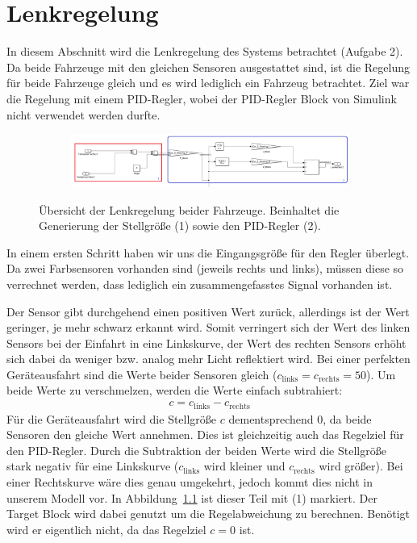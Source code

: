 \chapter{Lenkregelung}\label{sec:Lenkregelung}
In diesem Abschnitt wird die Lenkregelung des Systems betrachtet (Aufgabe 2). Da
beide Fahrzeuge mit den gleichen Sensoren ausgestattet sind, ist die Regelung
für beide Fahrzeuge gleich und es wird lediglich ein Fahrzeug betrachtet. Ziel
war die Regelung mit einem PID-Regler, wobei der PID-Regler Block von Simulink
nicht verwendet werden durfte.
\begin{figure}[hbt]
\centering
\begin{subfigure}{\textwidth}
    \centering
    \includegraphics*[width=\textwidth]{figures/Lenkregelung.png}
\end{subfigure}
    \caption{Übersicht der Lenkregelung beider Fahrzeuge. Beinhaltet die
        Generierung der Stellgröße (1) sowie den PID-Regler (2).
    \label{fig:lenkregelung}}
\end{figure}    
In einem ersten Schritt haben wir uns die Eingangsgröße für den Regler überlegt.
Da zwei Farbsensoren vorhanden sind (jeweils rechts und links), müssen diese so
verrechnet werden, dass lediglich ein zusammengefasstes Signal vorhanden ist.

Der Sensor gibt durchgehend einen positiven Wert zurück, allerdings ist der Wert
geringer, je mehr schwarz erkannt wird. Somit verringert sich der Wert des
linken Sensors bei der Einfahrt in eine Linkskurve, der Wert des rechten Sensors
erhöht sich dabei da weniger bzw. analog mehr Licht reflektiert wird. Bei einer
perfekten Geräteausfahrt sind die Werte beider Sensoren gleich
($c_\mathrm{links} = c_\mathrm{rechts} = 50$). Um beide Werte zu verschmelzen,
werden die Werte einfach subtrahiert:
\begin{align*}
    c = c_\mathrm{links} - c_\mathrm{rechts}
\end{align*}
Für die Geräteausfahrt wird die Stellgröße $c$ dementsprechend $0$, da beide
Sensoren den gleiche Wert annehmen. Dies ist gleichzeitig auch das Regelziel für
den PID-Regler. Durch die Subtraktion der beiden Werte wird die Stellgröße stark
negativ für eine Linkskurve ($c_\mathrm{links}$ wird kleiner und
$c_\mathrm{rechts}$ wird größer). Bei einer Rechtskurve wäre dies genau
umgekehrt, jedoch kommt dies nicht in unserem Modell vor. In
Abbildung~\ref{fig:lenkregelung} ist dieser Teil mit (1) markiert. Der Target
Block wird dabei genutzt um die Regelabweichung zu berechnen. Benötigt wird er
eigentlich nicht, da das Regelziel $c=0$ ist.

